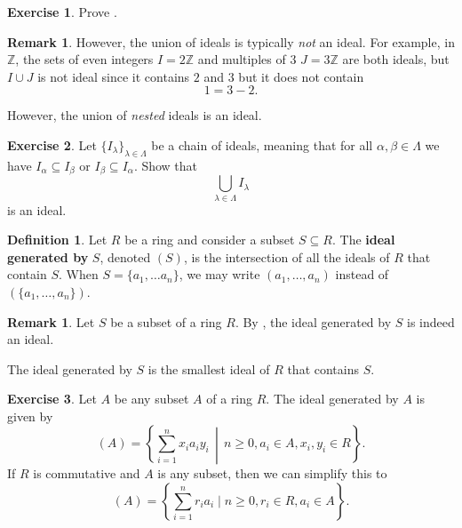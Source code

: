 \documentclass[12pt]{report}
\numberwithin{equation}{section}
\numberwithin{theorem}{chapter}
\theoremstyle{definition}
\newtheorem{definition}[theorem]{Definition}
\newtheorem{exercise}{Exercise}
\newtheorem*{basic properties}{Basic Properties}
\newtheorem*{Important Remark}{Important Remark}
\newtheorem{remark}[theorem]{Remark}
\newcommand{\df}[1]{{\bf #1}\index{#1}}
\newcommand{\Z}{\mathbb{Z}}
\begin{document}
\begin{exercise}
	Prove .
\end{exercise}



\begin{remark}
	However, the union of ideals is typically \emph{not} an ideal. For example, in $\Z$, the sets of even integers $I = 2\Z$ and multiples of $3$ $J = 3 \Z$ are both ideals, but $I \cup J$ is not ideal since it contains $2$ and $3$ but it does not contain
	$$1 = 3 - 2.$$
\end{remark}

However, the union of \emph{nested} ideals is an ideal.

\begin{exercise}\label{union of nested ideals is an ideal}
	Let $\{ I_\lambda \}_{\lambda \in \Lambda}$ be a chain of ideals, meaning that for all $\alpha, \beta \in \Lambda$ we have $I_{\alpha} \subseteq I_{\beta}$ or $I_{\beta} \subseteq I_{\alpha}$. Show that
	$$\bigcup_{\lambda \in \Lambda} I_{\lambda}$$
is an ideal.
\end{exercise}

\begin{definition}
Let $R$ be a ring and consider a subset $S \subseteq R$. The \df{ideal generated by} $S$, denoted $(S)$, is the intersection of all the ideals of $R$ that contain $S$. When $S = \{ a_1, \ldots a_n \}$, we may write $(a_1, \ldots, a_n)$ instead of $(\{a_1, \ldots, a_n\}).$
\end{definition}


\begin{remark}
	Let $S$ be a subset of a ring $R$. By , the ideal generated by $S$ is indeed an ideal.
\end{remark}


The ideal generated by $S$ is the smallest ideal of $R$ that contains $S$.


\begin{exercise}\label{ideal generated by}
Let $A$ be any subset $A$ of a ring $R$. The ideal generated by $A$ is given by
$$(A)=\left\lbrace \sum_{i=1}^n x_i a_i y_i \,\middle\vert\, n \geqslant 0, a_i \in A, x_i, y_i \in R \right\rbrace.$$
If $R$ is commutative and $A$ is any subset, then we can simplify this to
$$(A)=\left\{\sum_{i=1}^n r_i a_i \mid n \geqslant 0, r_i \in R, a_i \in A\right\}.$$ 
\end{exercise}
\end{document}
